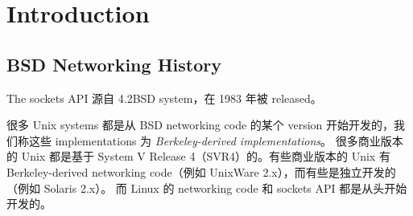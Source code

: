 \section{Introduction}

  \subsection{BSD Networking History}

    The sockets API 源自 4.2BSD system，在 1983 年被 released。
    
    很多 Unix systems 都是从 BSD networking code 的某个 version 开始开发的，我们称这些 implementations 为 \textit{Berkeley-derived implementations}。
    很多商业版本的 Unix 都是基于 System V Release 4（SVR4）的。有些商业版本的 Unix 有 Berkeley-derived networking code（例如 UnixWare 2.x），而有些是独立开发的（例如 Solaris 2.x）。
    而 Linux 的 networking code 和 sockets API 都是从头开始开发的。

